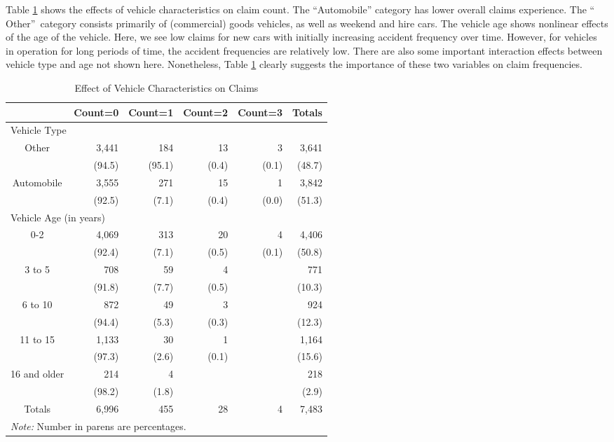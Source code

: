 {Table \ref{T12:SingIntroStats} shows the effects of vehicle
characteristics on claim count. The ``Automobile'' category has
lower overall claims experience. The \textquotedblleft
Other\textquotedblright\ category consists primarily of (commercial)
goods vehicles, as well as weekend and hire cars. The vehicle age
shows nonlinear effects of the age of the vehicle. Here, we see low
claims for new cars with initially increasing accident frequency
over time. However, for vehicles in operation for long periods of
time, the accident frequencies are relatively low. There are also
some important interaction effects between vehicle type and age not
shown here. Nonetheless, Table \ref{T12:SingIntroStats} clearly
suggests the importance of these two variables on claim frequencies.

  \begin{center}  \begin{table}[h]
\caption{\label{T12:SingIntroStats}  Effect of Vehicle
Characteristics on Claims} 
\begin{tabular}{crrrr|r}
\hline & Count=0 & Count=1 & Count=2 & Count=3 & Totals \\ \hline
\multicolumn{6}{l}{Vehicle Type} \\
Other & 3,441 & 184 & 13 & 3 & 3,641 \\
& (94.5) & (95.1) & (0.4) & (0.1) & (48.7) \\
Automobile & 3,555 & 271 & 15 & 1 & 3,842 \\
& (92.5) & (7.1) & (0.4) & (0.0) & (51.3) \\ \hline
\multicolumn{6}{l}{Vehicle Age (in years)} \\
0-2 & 4,069 & 313 & 20 & 4 & 4,406 \\
& (92.4) & (7.1) & (0.5) & (0.1) & (50.8) \\
3 to 5 & 708 & 59 & 4 &  & 771 \\
& (91.8) & (7.7) & (0.5) &  & (10.3) \\
6 to 10 & 872 & 49 & 3 &  & 924 \\
& (94.4) & (5.3) & (0.3) &  & (12.3) \\
11 to 15 & 1,133 & 30 & 1 &  & 1,164 \\
& (97.3) & (2.6)& (0.1) &  & (15.6) \\
16 and older & 214 & 4 &  &  & 218 \\
& (98.2) & (1.8)&  &  & (2.9) \\ \hline Totals & 6,996 & 455 & 28 &
4 & 7,483 \\ \hline \multicolumn{6}{l}{{\emph{Note:}} Number in
parens are
percentages.} \\
\end{tabular}
\end{table}  \end{center}

}
